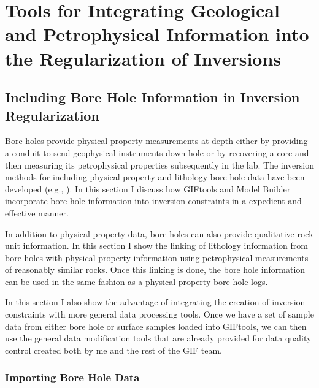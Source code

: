 



\chapter{Tools for Integrating Geological and Petrophysical Information into the Regularization of Inversions}
\label{ch:GIFtools}

\section{Including Bore Hole Information in Inversion Regularization}
\label{sec:BHandSS}

Bore holes provide physical property measurements at depth either by providing a conduit to send geophysical instruments down hole or by recovering a core and then measuring its petrophysical properties subsequently in the lab.  The inversion methods for including physical property and lithology bore hole data  have been developed (e.g., \cite{williams2008geologically}). In this section I discuss how GIFtools and Model Builder incorporate bore hole information into inversion constraints in a expedient and effective manner.

In addition to physical property data, bore holes can also provide qualitative rock unit information. In this section I show the linking of lithology information from bore holes with physical property information using petrophysical measurements of reasonably similar rocks. Once this linking is done, the bore hole information can be used in the same fashion as a physical property bore hole logs.

In this section I also show the advantage of integrating the creation of inversion constraints with more general data processing tools. Once we have a set of sample data from either bore hole or surface samples loaded into GIFtools, we can then use the general data modification tools that are already provided for data quality control created both by me and the rest of the \ac{GIF} team.

\subsection{Importing Bore Hole Data}
\label{subsec:importBH}

